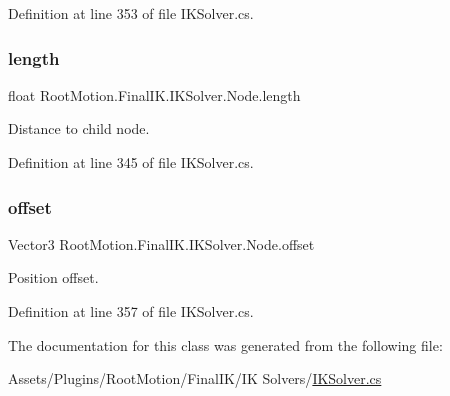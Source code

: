 Definition at line 353 of file I\+K\+Solver.\+cs.

\mbox{\label{class_root_motion_1_1_final_i_k_1_1_i_k_solver_1_1_node_a9c67ae3e7f25268203b6cb4dca75ba29}} 
\subsubsection{\texorpdfstring{length}{length}}
{\footnotesize\ttfamily float Root\+Motion.\+Final\+I\+K.\+I\+K\+Solver.\+Node.\+length}



Distance to child node. 



Definition at line 345 of file I\+K\+Solver.\+cs.

\mbox{\label{class_root_motion_1_1_final_i_k_1_1_i_k_solver_1_1_node_a32f649e28e7a75f6f767d989c7854c5a}} 
\subsubsection{\texorpdfstring{offset}{offset}}
{\footnotesize\ttfamily Vector3 Root\+Motion.\+Final\+I\+K.\+I\+K\+Solver.\+Node.\+offset}



Position offset. 



Definition at line 357 of file I\+K\+Solver.\+cs.



The documentation for this class was generated from the following file\+:\begin{DoxyCompactItemize}
\item 
Assets/\+Plugins/\+Root\+Motion/\+Final\+I\+K/\+I\+K Solvers/\mbox{\hyperlink{_i_k_solver_8cs}{I\+K\+Solver.\+cs}}\end{DoxyCompactItemize}
